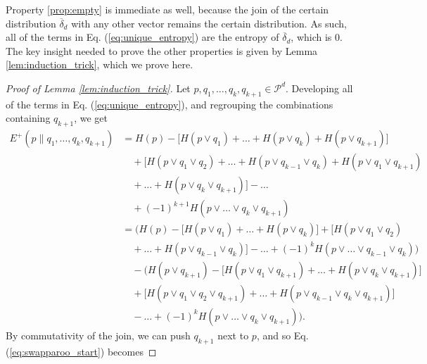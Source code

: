 Property \ref{prop:empty} is immediate as well, because the join of the certain distribution $\overline{\delta}_d$ with any other vector remains the certain distribution. As such, all of the terms in Eq. (\ref{eq:unique_entropy}) are the entropy of $\overline{\delta}_d$, which is 0.  The key insight needed to prove the other properties is given by Lemma \ref{lem:induction_trick}, which we prove here.

\begin{proof}[Proof of Lemma \ref{lem:induction_trick}]
    Let $p, q_1, \dots, q_k, q_{k+1} \in \mathcal{P}^d$. Developing all of the terms in Eq. (\ref{eq:unique_entropy}), and regrouping the combinations containing $q_{k+1}$, we get
    \begin{align}
        E^+(p \parallel q_1, \dots, q_k, q_{k+1}) &= H(p) - \Big[H(p \vee q_1) + \dots + H(p \vee q_k) + H(p \vee q_{k+1})\Big] \nonumber \\
                                                  &\quad + \Big[H(p \vee q_1 \vee q_2) + \dots + H(p \vee q_{k-1} \vee q_k) + H(p \vee q_1 \vee q_{k+1}) \nonumber \\
                                                  &\quad + \dots + H(p \vee q_k \vee q_{k+1})\Big] - \dots\nonumber \\
                                                  &\quad + (-1)^{k+1} H(p \vee \dots \vee q_k \vee q_{k+1})\\
                                                  &= \Big(H(p) - \big[H(p \vee q_1) + \dots + H(p \vee q_k)\big] + \big[H(p \vee q_1 \vee q_2)\nonumber \\
                                                  &\quad + \dots + H(p \vee q_{k-1} \vee q_k)\big] - \dots + (-1)^{k} H(p \vee \dots \vee q_{k-1} \vee q_{k})\Big) \nonumber \\
                                                  &\quad - \Big(H(p \vee q_{k+1}) - \big[H(p \vee q_1 \vee q_{k+1}) + \dots + H(p \vee q_k \vee q_{k+1})\big]\nonumber \\
                                                  &\quad + \big[H(p \vee q_1 \vee q_2 \vee q_{k+1}) + \dots + H(p \vee q_{k-1} \vee q_k \vee q_{k+1})\big]\nonumber \\
                                                  &\quad - \dots + (-1)^{k} H(p \vee \dots \vee q_k \vee q_{k+1})\Big). \label{eq:swapparoo_start}
    \end{align}
    By commutativity of the join, we can push $q_{k+1}$ next to $p$, and so Eq. (\ref{eq:swapparoo_start}) becomes

\end{proof}
